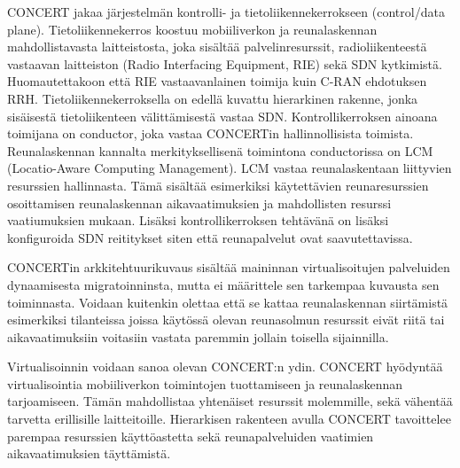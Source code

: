 CONCERT jakaa järjestelmän kontrolli- ja tietoliikennekerrokseen (control/data plane). 
Tietoliikennekerros koostuu mobiiliverkon ja reunalaskennan mahdollistavasta laitteistosta, joka sisältää palvelinresurssit, radioliikenteestä vastaavan laitteiston (Radio Interfacing Equipment, RIE) sekä SDN kytkimistä. Huomautettakoon että RIE vastaavanlainen toimija kuin C-RAN ehdotuksen RRH.
Tietoliikennekerroksella on edellä kuvattu hierarkinen rakenne, jonka sisäisestä tietoliikenteen välittämisestä vastaa SDN.
Kontrollikerroksen ainoana toimijana on conductor, joka vastaa CONCERTin hallinnollisista toimista.
Reunalaskennan kannalta merkityksellisenä toimintona conductorissa on LCM (Locatio-Aware Computing Management).
LCM vastaa reunalaskentaan liittyvien resurssien hallinnasta. Tämä sisältää esimerkiksi käytettävien reunaresurssien osoittamisen reunalaskennan aikavaatimuksien ja mahdollisten resurssi vaatiumuksien mukaan.
Lisäksi kontrollikerroksen tehtävänä on lisäksi konfiguroida SDN reititykset siten että reunapalvelut ovat saavutettavissa.

CONCERTin arkkitehtuurikuvaus sisältää maininnan virtualisoitujen palveluiden dynaamisesta migratoinninsta, mutta ei määrittele sen tarkempaa kuvausta sen toiminnasta. Voidaan kuitenkin olettaa että se kattaa reunalaskennan siirtämistä esimerkiksi tilanteissa joissa käytössä olevan reunasolmun resurssit eivät riitä tai aikavaatimuksiin voitasiin vastata paremmin jollain toisella sijainnilla.

Virtualisoinnin voidaan sanoa olevan CONCERT:n ydin. CONCERT hyödyntää virtualisointia mobiiliverkon toimintojen tuottamiseen ja reunalaskennan tarjoamiseen. Tämän mahdollistaa yhtenäiset resurssit molemmille, sekä vähentää tarvetta erillisille laitteitoille.
Hierarkisen rakenteen avulla CONCERT tavoittelee parempaa resurssien käyttöastetta sekä  reunapalveluiden vaatimien aikavaatimuksien täyttämistä.
